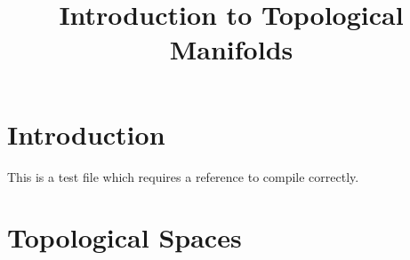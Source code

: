 


%


\title{Introduction to Topological Manifolds}


\maketitle

\label{section-phantom}

\tableofcontents

\section{Introduction}
\label{section-introduction}

This is a test file which requires a reference to compile correctly. \cite{Maclane}

\section{Topological Spaces}
\label{section-topological-spaces}

